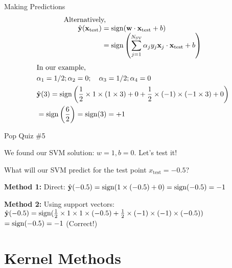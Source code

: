 \documentclass{beamer}
\begin{document}
\begin{frame}{Making Predictions}
\begin{align*}
\begin{array}{l}
{\text {Alternatively, }} \\
{\qquad \begin{aligned}
\hat{\mathbf{y}}(\mathbf{x}_{\text{test}}) &=\operatorname{sign}(\mathbf{w} \cdot \mathbf{x}_{\text{test}}+b) \\
&=\operatorname{sign} \left(\sum_{j=1}^{N_{\text{SV}}} \alpha_{j} y_{j} \mathbf{x}_{j} \cdot \mathbf{x}_{\text{test}}+b\right)
\end{aligned}}
\end{array}
\end{align*}
\begin{align*}
\begin{aligned}
&\text{In our example,} \\
&\alpha_{1}=1/2 ; \alpha_{2}=0 ; \quad \alpha_{3}=1/2 ; \alpha_{4}=0\\
&\hat{\mathbf{y}}(3) =\operatorname{sign}\left(\frac{1}{2} \times 1 \times (1 \times 3)+0+\frac{1}{2} \times (-1) \times (-1 \times 3)+0\right)\\
&=\operatorname{sign} \left(\frac{6}{2}\right)=\operatorname{sign}(3)=+1
\end{aligned}
\end{align*}

\end{frame}

\begin{frame}{Pop Quiz \#5}
\begin{tcolorbox}[colback=blue!5!white,colframe=blue!75!black,title=Prediction Power!]
We found our SVM solution: $w = 1, b = 0$. Let's test it!

What will our SVM predict for the test point $x_{\text{test}} = -0.5$?

\pause
\textbf{Method 1:} Direct: $\hat{\mathbf{y}}(-0.5) = \operatorname{sign}(1 \times (-0.5) + 0) = \operatorname{sign}(-0.5) = -1$

\pause  
\textbf{Method 2:} Using support vectors:
$\hat{\mathbf{y}}(-0.5) = \operatorname{sign}(\frac{1}{2} \times 1 \times 1 \times (-0.5) + \frac{1}{2} \times (-1) \times (-1) \times (-0.5))$
$ = \operatorname{sign}(-0.5) = -1$ (Correct!)
\end{tcolorbox}
\end{frame}

\section{Kernel Methods}

{
	
}
\end{document}
